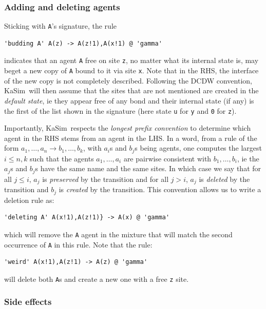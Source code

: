 \documentclass[11pt]{book}
\def\KaSim{\textsf{KaSim}}
\def\ttt#1{\texttt{#1}}
\def\rar{\rightarrow}
\def\ie{ie }
\def\via{via }
\begin{document}
\subsubsection*{Adding and deleting agents}
Sticking with \ttt{A}'s signature, the rule
\begin{lstlisting}[language=kappa]
'budding A' A(z) -> A(z!1),A(x!1) @ 'gamma'
\end{lstlisting}
indicates that an agent \ttt{A} free on site \ttt{z}, no matter what its internal state is, may beget a new copy of \ttt{A} bound to it \via site \ttt{x}. Note that in the RHS, the interface of the new copy is not completely described. Following the DCDW convention, \KaSim~will then assume that the sites that are not mentioned are created in the \emph{default state}, \ie they appear free of any bond and their internal state (if any) is the first of the list shown in the signature (here state \ttt{u} for \ttt{y} and \ttt{0} for \ttt{z}).

Importantly, \KaSim~respects the \emph{longest prefix convention} to determine which agent in the RHS stems from an agent in the LHS.
In a word, from a rule of the form $a_1,\dots,a_n\rar b_1,\dots,b_k$, with $a_i$s and $b_j$s being agents, one computes the largest $i\leq n,k$ such that the agents $a_1,\dots,a_i$ are pairwise consistent with $b_1,\dots,b_i$, \ie the $a_j$s and $b_j$s have the same name and the same sites. In which case we say that for all $j\leq i$, $a_j$ is \emph{preserved} by the transition and for all $j>i$, $a_j$ is \emph{deleted} by the transition and $b_j$ is \emph{created} by the transition. This convention allows us to write a deletion rule as:
\begin{lstlisting}[language=kappa]
'deleting A' A(x!1),A(z!1)} -> A(x) @ 'gamma'
\end{lstlisting}
which will remove the \ttt{A} agent in the mixture that will match the second occurrence of \ttt{A} in this rule.
Note that the rule:
\begin{lstlisting}[language=kappa]
'weird' A(x!1),A(z!1) -> A(z) @ 'gamma'
\end{lstlisting}
will delete both \ttt{A}s and create a new one with a free \ttt{z} site.

\subsubsection*{Side effects}\label{sec:side-effect}
\end{document}
